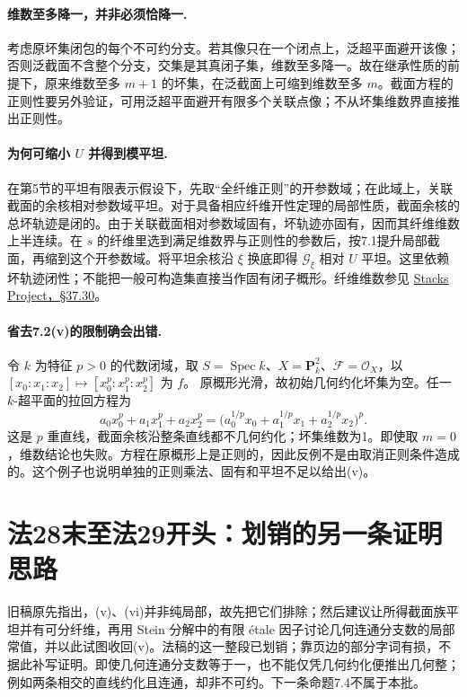 \documentclass[openany,fontset=fandol]{ctexbook}
\DeclareMathOperator{\Spec}{Spec}
\newcommand{\FF}{\mathcal F}
\newcommand{\GG}{\mathcal G}
\newcommand{\OO}{\mathcal O}
\begin{document}
\paragraph{维数至多降一，并非必须恰降一.}
考虑原坏集闭包的每个不可约分支。若其像只在一个闭点上，泛超平面避开该像；否则泛截面不含整个分支，交集是其真闭子集，维数至多降一。故在继承性质的前提下，原来维数至多 $m+1$ 的坏集，在泛截面上可缩到维数至多 $m$。截面方程的正则性要另外验证，可用泛超平面避开有限多个关联点像；不从坏集维数界直接推出正则性。

\paragraph{为何可缩小 $U$ 并得到模平坦.}
在第5节的平坦有限表示假设下，先取“全纤维正则”的开参数域；在此域上，关联截面的余核相对参数域平坦。对于具备相应纤维开性定理的局部性质，截面余核的总坏轨迹是闭的。由于关联截面相对参数域固有，坏轨迹亦固有，因而其纤维维数上半连续。在 $s$ 的纤维里选到满足维数界与正则性的参数后，按7.1提升局部截面，再缩到这个开参数域。将平坦余核沿 $\xi$ 换底即得 $\GG_\xi$ 相对 $U$ 平坦。这里依赖坏轨迹闭性；不能把一般可构造集直接当作固有闭子概形。纤维维数参见 \href{https://stacks.math.columbia.edu/tag/05F6}{Stacks Project，§37.30}。

\paragraph{省去7.2(v)的限制确会出错.}
令 $k$ 为特征 $p>0$ 的代数闭域，取 $S=\Spec k$、$X=\mathbf P_k^2$、$\FF=\OO_X$，以
$[x_0:x_1:x_2]\mapsto[x_0^p:x_1^p:x_2^p]$ 为 $f$。
原概形光滑，故初始几何约化坏集为空。任一 $k$-超平面的拉回方程为
\[
 a_0x_0^p+a_1x_1^p+a_2x_2^p
   =\bigl(a_0^{1/p}x_0+a_1^{1/p}x_1+a_2^{1/p}x_2\bigr)^p .
\]
这是 $p$ 重直线，截面余核沿整条直线都不几何约化；坏集维数为1。即使取 $m=0$，维数结论也失败。方程在原概形上是正则的，因此反例不是由取消正则条件造成的。这个例子也说明单独的正则乘法、固有和平坦不足以给出(v)。

\section*{法28末至法29开头：划销的另一条证明思路}
旧稿原先指出，(v)、(vi)并非纯局部，故先把它们排除；然后建议让所得截面族平坦并有可分纤维，再用 Stein 分解中的有限 étale 因子讨论几何连通分支数的局部常值，并以此试图收回(v)。法稿的这一整段已划销；靠页边的部分字词有损，不据此补写证明。即使几何连通分支数等于一，也不能仅凭几何约化便推出几何整；例如两条相交的直线约化且连通，却非不可约。下一条命题7.4不属于本批。
\end{document}
